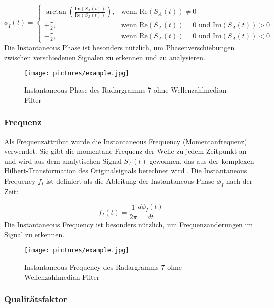 \begin{equation}
    \phi_I(t) =
    \begin{cases}
        \arctan\left(\frac{\text{Im}(S_A(t))}{\text{Re}(S_A(t))}\right), & \text{wenn } \text{Re}(S_A(t)) \neq 0 \\
        +\frac{\pi}{2}, & \text{wenn } \text{Re}(S_A(t)) = 0 \text{ und } \text{Im}(S_A(t)) > 0 \\
        -\frac{\pi}{2}, & \text{wenn } \text{Re}(S_A(t)) = 0 \text{ und } \text{Im}(S_A(t)) < 0
    \end{cases}
\end{equation}
Die Instantaneous Phase ist besonders nützlich, um Phasenverschiebungen zwischen verschiedenen Signalen zu erkennen und zu analysieren.

\begin{figure}[H]
    \centering
    \texttt{[image: pictures/example.jpg]}
    \caption{Instantaneous Phase des Radargramms 7 ohne Wellenzahlmedian-Filter}
    \label{fig:inst_phase}
\end{figure}

\subsubsection{Frequenz}

Als Frequenzattribut wurde die Instantaneous Frequency (Momentanfrequenz) \parencite{taner_complex_1979} verwendet. Sie gibt die momentane Frequenz der Welle zu jedem Zeitpunkt an und wird aus dem analytischen Signal $S_A(t)$ gewonnen, das aus der komplexen Hilbert-Transformation des Originalsignals berechnet wird \parencite[S. 177]{sheriff_encyclopedic_2002}. Die Instantaneous Frequency $f_I$ ist definiert als die Ableitung der Instantaneous Phase $\phi_I$ nach der Zeit:

\begin{equation}
    f_I(t) = \frac{1}{2\pi} \frac{d\phi_I(t)}{dt}
\end{equation}
Die Instantaneous Frequency ist besonders nützlich, um Frequenzänderungen im Signal zu erkennen.

\begin{figure}[H]
    \centering
    \texttt{[image: pictures/example.jpg]}
    \caption{Instantaneous Frequency des Radargramms 7 ohne Wellenzahlmedian-Filter}
    \label{fig:inst_freq}
\end{figure}

\subsubsection{Qualitätsfaktor}

